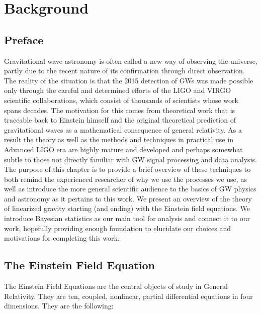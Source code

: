 \chapter{Background}
\section{Preface}
Gravitational wave astronomy is often called a new way of observing the universe, partly due to the recent nature of its confirmation through direct observation. The reality of the situation is that the 2015 detection of GWs was made possible only through the careful and determined efforts of the LIGO and VIRGO scientific collaborations, which consist of thousands of scientists whose work spans decades. The motivation for this comes from theoretical work that is traceable back to Einstein himself and the original theoretical prediction of gravitational waves as a mathematical consequence of general relativity. As a result the theory as well as the methods and techniques in practical use in Advanced LIGO era are highly mature and developed and perhaps somewhat subtle to those not directly familiar with GW signal processing and data analysis. The purpose of this chapter is to provide a brief overview of these techniques to both remind the experienced researcher of why we use the processes we use, as well as introduce the more general scientific audience to the basics of GW physics and astronomy as it pertains to this work. We present an overview of the theory of linearized gravity starting (and ending) with the Einstein field equations. We introduce Bayesian statistics as our main tool for analysis and connect it to our work, hopefully providing enough foundation to elucidate our choices and motivations for completing this work.  

\section{The Einstein Field Equation}
The Einstein Field Equations are the central objects of study in General Relativity. They are ten, coupled, nonlinear, partial differential equations in four dimensions. They are the following:


